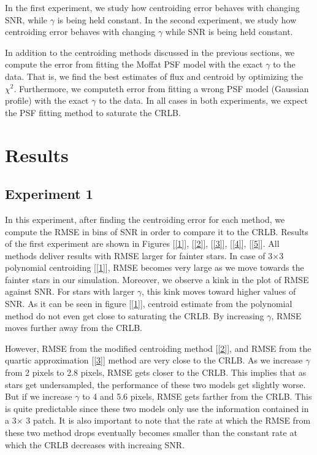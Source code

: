 \documentclass[12pt, preprint]{aastex}
\begin{document}
In the first experiment, we study how centroiding error behaves with changing
SNR, while $\gamma$ is being held constant. In the second experiment, we study 
how centroiding error behaves with changing $\gamma$ while SNR is being held constant.

In addition to the centroiding methods discussed in the previous sections,
we compute the error from fitting the Moffat PSF model with the exact $\gamma$ to
the data. That is, we find the best estimates of flux and centroid by
optimizing the $\chi^{2}$. Furthermore, we computeth error from fitting a
wrong PSF model (Gaussian profile) with the exact $\gamma$ to the data.
In all cases in both experiments, we expect the PSF fitting method to saturate 
the CRLB. 

\section{Results}\label{sec:results}

\subsection{Experiment 1}
   
In this experiment, after finding the centroiding error for each method, we compute the RMSE in bins of SNR in order to compare it to the CRLB. 
Results of the first experiment are shown in Figures [\ref{1}], [\ref{2}], [\ref{3}], [\ref{4}], [\ref{5}]. All methods deliver results with RMSE larger for fainter stars.
In case of 3$\times$3 polynomial centroiding [\ref{1}], RMSE becomes very large as we move towards the fainter stars in our simulation. Moreover, we observe a kink in the plot of RMSE against SNR. For stars with larger $\gamma$, this kink moves toward higher values of SNR. As it can be seen in figure [\ref{1}], centroid estimate from the polynomial method do not even get close to saturating the CRLB. By increasing $\gamma$, RMSE moves further away from the CRLB.

However, RMSE from the modified centroiding method [\ref{2}], and RMSE from the quartic approximation [\ref{3}] method are very close to the CRLB. As we increase $\gamma$ from 2 pixels to 2.8 pixels, RMSE gets closer to the CRLB. This implies that as stars get undersampled, the performance of these two models get slightly worse. But if we increase $\gamma$ to 4 and 5.6 pixels, RMSE gets farther from the CRLB. This is quite predictable since these two models only use the information contained in a 3$\times$ 3 patch. It is also important to note that the rate at which the RMSE from these two method drops eventually becomes smaller than the constant rate at which the CRLB decreases with increaing SNR.
\end{document}
